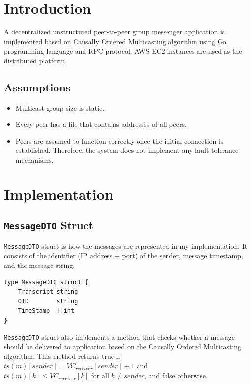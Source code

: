 \documentclass[a4paper]{article}
\author{\contactName\\\href{mailto:\contactMail}{\contactMail}}
\title{\handoutTitle}
\date{Date: \handoutDate}
\begin{document}
\maketitle

\tableofcontents

\newpage

\section{Introduction}

A decentralized unstructured peer-to-peer group messenger application is implemented based on Causally Ordered Multicasting algorithm using Go programming language and RPC protocol. AWS EC2 instances are used as the distributed platform.

\subsection{Assumptions}

\begin{itemize}
    \item Multicast group size is static.
    \item Every peer has a file that contains addresses of all peers.
    \item Peers are assumed to function correctly once the initial connection is established. Therefore, the system does not implement any fault tolerance mechanisms.
\end{itemize}

\section{Implementation}

\subsection{\texttt{MessageDTO} Struct}
\texttt{MessageDTO} struct is how the messages are represented in my implementation. It consists of the identifier (IP address + port) of the sender, message timestamp, and the message string.

\begin{lstlisting}[caption={\texttt{MessageDTO} struct}]
type MessageDTO struct {
    Transcript string
    OID        string
    TimeStamp  []int
}
\end{lstlisting}
\texttt{MessageDTO} struct also implements a method that checks whether a message should be delivered to application based on the Causally  Ordered  Multicasting  algorithm. This method returns true if $ts(m)[sender] = VC_{receiver}[sender] + 1$ and $ts(m)[k] \leq VC_{receiver}[k] \text{ for all } k \neq sender$, and false otherwise. 
\end{document}

